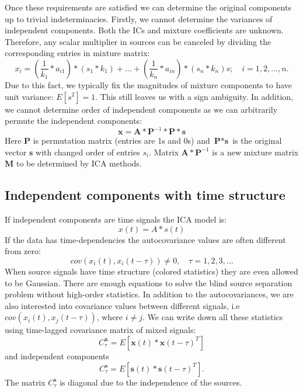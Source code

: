 \documentclass{article}
\begin{document}
Once these requirements are satisfied we can determine the original components up to trivial indeterminacies. Firstly, we cannot determine the variances of independent components. Both the
ICs and mixture coefficients are unknown. Therefore, any scalar multiplier in sources can be canceled by dividing the corresponding entries in mixture matrix:
\begin{equation}
    x_i = (\frac{1}{k_1}*a_{i1}) * (s_1*k_1) + ... + (\frac{1}{k_n}*a_{in}) * (s_n*k_n)s;\quad i=1, 2, ..., n.
\end{equation}
Due to this fact, we typically fix the magnitudes of mixture components to have unit variance: $E\left[s^{2}\right]=1$. This still leaves us with a sign ambiguity.
In addition, we cannot determine order of independent components as we can arbitrarily permute the independent components:
\begin{equation}
    \textbf{x} = \textbf{A} * \textbf{P}^{-1} * \textbf{P} * \textbf{s}
\end{equation}
Here $\textbf{P}$ is permutation matrix (entries are 1s and 0s) and $\textbf{P} * \textbf{s}$ is the original vector $\textbf{s}$ with changed order of entries $s_i$. Matrix $\textbf{A} * \textbf{P}^{-1}$ is a new mixture matrix $\textbf{M}$ to be determined by ICA methods.

\subsection{Independent components with time structure}
If independent components are time signals the ICA model is:
\begin{equation}
    x(t) = A * s(t)
\label{ica_temporal}
\end{equation}
If the data has time-dependencies the autocovariance values are often different from zero:
\begin{equation}
    cov(x_i(t), x_i(t-\tau)) \neq 0, \quad \tau = 1, 2, 3, ...
\end{equation}
When source signals have time structure (colored statistics) they are even allowed to be Gaussian.
There are enough equations to solve the blind source separation problem without high-order statistics.
In addition to the autocovariances, we are also interested into covariance values between different signals, i.e $cov(x_i(t), x_j(t-\tau))$, where $i \neq j$. We can write down all these statistics using time-lagged covariance matrix of mixed signals:
\begin{equation}
    C_{\tau}^{\textbf{x}} = E\left[\textbf{x}(t)*\textbf{x}(t-\tau)^T\right]
\label{covariance_mix}
\end{equation}
and independent components
\begin{equation}
    C_{\tau}^{\textbf{s}} = E\left[\textbf{s}(t)*\textbf{s}(t-\tau)^T\right].
\label{covariance_source}
\end{equation}
The matrix $C_{\tau}^{\textbf{s}}$ is diagonal due to the independence of the sources.
\end{document}
